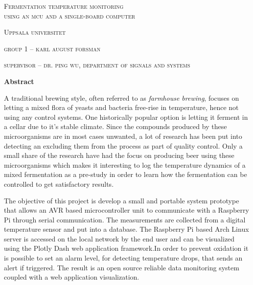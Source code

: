 \thispagestyle{plain}
\begin{center}
    \Large
    \textsc{Fermentation temperature monitoring} \\
    \vspace{0.1cm}
    \small
    \textsc{using an mcu and a single-board computer}
        
    \vspace{0.1cm}
    \small
    \textsc{Uppsala universitet}

    \vspace{0.2cm}
    \textsc{group 1 -- karl august forsman}
    
    \vspace{0.1cm}
    \textsc{supervisor -- dr. ping wu, department of signals and systems}
       
    \vspace{0.9cm}
    \textbf{Abstract}
\end{center}

A traditional brewing style, often referred to as 
\textit{farmhouse brewing}, focuses on letting a mixed flora of yeasts and bacteria free-rise in temperature, hence not using any control systems. One historically popular option is letting it ferment in a cellar due to it's stable climate. Since the compounds produced by these microorganisms are in most cases unwanted, a lot of research has been put into detecting an excluding them from the process as part of quality control. Only a small share of the research have had the focus on producing beer using these microorganisms which makes it interesting to log the temperature dynamics of a mixed fermentation as a pre-study in order to learn how the fermentation can be controlled to get satisfactory results.

The objective of this project is develop a small and portable system prototype that allows an AVR based microcontroller unit to communicate with a Raspberry Pi through serial communication. The measurements are collected from a digital temperature sensor and put into a database. The Raspberry Pi based Arch Linux server is accessed on the local network by the end user and can be visualized using the Plotly Dash web application framework.In order to prevent oxidation it is possible to set an alarm level, for detecting temperature drops, that sends an alert if triggered. The result is an open source reliable data monitoring system coupled with a web application visualization.
\restoregeometry
